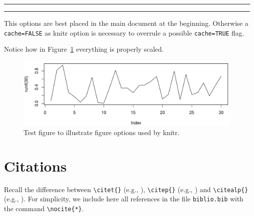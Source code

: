 % 



\hrule





\hrule

\bigskip 

This options are best placed in the main document at the beginning. Otherwise a \verb+cache=FALSE+ as knitr option is necessary to overrule a possible  \verb+cache=TRUE+ flag. 

\bigskip 

Notice how in Figure~\ref{f02:1} everything is properly scaled.   

\begin{figure}
\begin{knitrout}
\color{fgcolor}

{\centering \includegraphics[width=\textwidth-3cm]{figure/ch02_figunnamed-chunk-3-1} 

}


\end{knitrout}
  \caption{Test figure to illustrate figure options used by knitr.}
  \label{f02:1}
\end{figure}


\section{Citations}

Recall the difference between \verb+\citet{}+ (e.g., \citet{Chu:Geor:99}), \verb+\citep{}+ (e.g., \citep{Chu:Geor:99}) and \verb+\citealp{}+ (e.g., \citealp{Chu:Geor:99}).
For simplicity, we include here all references in the file \verb+biblio.bib+ with the command \verb+\nocite{*}+.\nocite{*}


